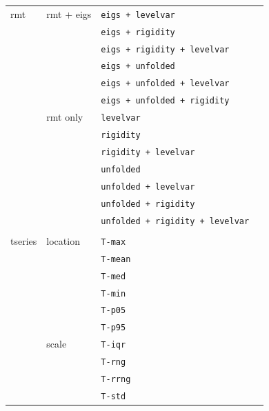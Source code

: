 \documentclass[12pt]{spieman}  %
\newcommand{\tcode}[1]{\footnotesize \texttt{#1} \normalsize}
\begin{document}
\begin{spacing}{2}
\begin{table}[h!]
\begin{tabular}{lllr}
rmt            & rmt + eigs    & \tcode{eigs + levelvar}                \\
               &               & \tcode{eigs + rigidity}                \\
               &               & \tcode{eigs + rigidity + levelvar}     \\
               &               & \tcode{eigs + unfolded}                \\
               &               & \tcode{eigs + unfolded + levelvar}     \\
               &               & \tcode{eigs + unfolded + rigidity}     \\
               & rmt only      & \tcode{levelvar}                       \\
               &               & \tcode{rigidity}                       \\
               &               & \tcode{rigidity + levelvar}            \\
               &               & \tcode{unfolded}                       \\
               &               & \tcode{unfolded + levelvar}            \\
               &               & \tcode{unfolded + rigidity}            \\
               &               & \tcode{unfolded + rigidity + levelvar} \\
               &               &                                        \\
tseries        & location      & \tcode{T-max}                          \\
               &               & \tcode{T-mean}                         \\
               &               & \tcode{T-med}                          \\
               &               & \tcode{T-min}                          \\
               &               & \tcode{T-p05}                          \\
               &               & \tcode{T-p95}                          \\
               & scale         & \tcode{T-iqr}                          \\
               &               & \tcode{T-rng}                          \\
               &               & \tcode{T-rrng}                         \\
               &               & \tcode{T-std}                          \\
\hline
\end{tabular}
\end{table}




\end{spacing}
\end{document}
